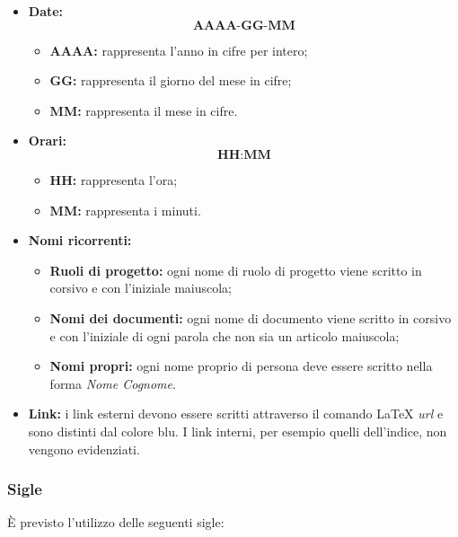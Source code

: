 \documentclass[../NormediProgetto.tex]{subfiles}
\begin{document}
\begin{itemize}
	
	\item{\textbf{Date:}}  \[\textbf{AAAA-GG-MM}\]
	\begin{itemize}
		\item{\textbf{AAAA:}} rappresenta l'anno in cifre per intero;
		\item{\textbf{GG:}} rappresenta il giorno del mese in cifre;
		\item{\textbf{MM:}} rappresenta il mese in cifre.
		
	\end{itemize}
	
	\item{\textbf{Orari:}} \[\textbf{HH:MM}\]
	\begin{itemize}
		\item{\textbf{HH:}} rappresenta l'ora;
		\item{\textbf{MM:}} rappresenta i minuti.
	\end{itemize}
	
	\item{\textbf{Nomi ricorrenti:}}
	\begin{itemize}
		\item{\textbf{Ruoli di progetto:}} ogni nome di ruolo di progetto viene scritto in corsivo e con l’iniziale maiuscola;
		\item{\textbf{Nomi dei documenti:}} ogni nome di documento viene scritto in corsivo e con l’iniziale di ogni parola che non sia un articolo maiuscola;
		\item{\textbf{Nomi propri:}} ogni nome proprio di persona deve essere scritto nella forma \textit{Nome Cognome}.
	\end{itemize}
	
	\item{\textbf{Link:}} i link esterni devono essere scritti attraverso il comando \LaTeX{} \textit{url} e sono distinti dal colore blu. I link interni, per esempio quelli dell'indice, non vengono evidenziati.
\end{itemize}

\subsubsection{Sigle}

È previsto l’utilizzo delle seguenti sigle: 
\end{document}
